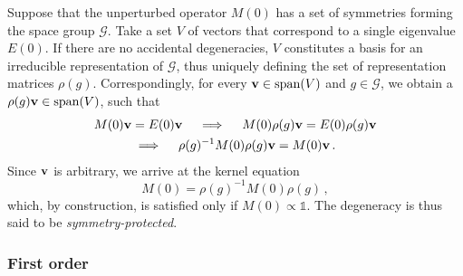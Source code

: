Suppose that the unperturbed operator $M(0)$ has a set of symmetries forming the space group $\mathcal{G}$. Take a set $V$ of vectors that correspond to a single eigenvalue $E(0)$.  If there are no accidental degeneracies, $V$ constitutes a basis for an irreducible representation of $\mathcal{G}$, thus uniquely defining the set of representation matrices $\rho(g)$. Correspondingly, for every $\vb{v} \in \text{span}(V)$ and $g \in \mathcal{G}$, we obtain a $\rho(g) \vb{v} \in \text{span}(V)$, such that
\begin{equation}
\begin{gathered}
M(0)\vb{v} = E(0) \vb{v} \quad \implies \quad M(0) \rho(g) \vb{v} = E(0) \rho(g) \vb{v} \\
\implies \quad \rho(g)^{-1} M(0) \rho(g) \vb{v} =  M(0) \vb{v} \,.
\end{gathered}
\end{equation}
Since $\vb{v}$ is arbitrary, we arrive at the kernel equation
\begin{equation} \label{seq:zeroconstraint}
M(0) = \rho(g)^{-1} M(0) \rho(g)\,,
\end{equation}
which, by construction, is satisfied only if $M(0) \propto \mathbb{1}$. The degeneracy is thus said to be \textit{symmetry-protected}.
\\

\subsubsection{First order} 


